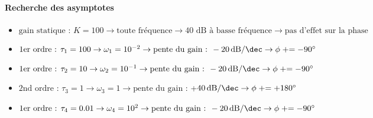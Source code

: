 \paragraph{Recherche des asymptotes}
\begin{itemize}
\item $\textrm{gain statique : } K=100      \rightarrow 
      \textrm{toute fréquence}           \rightarrow 
      \textrm{40 dB à basse fréquence}   \rightarrow 
      \textrm{pas d'effet sur la phase}$
\item $\textrm{1er ordre : }\tau_1=100     \rightarrow 
      \omega_1=10^{-2}                   \rightarrow 
      \textrm{pente du gain : } 
      \SI[per-mode=symbol]{-20}{\dB\per\dec} \rightarrow 
      \phi\mathrel{+}=-90\si{\degree}$ 
\item $ \textrm{1er ordre : }\tau_2=10     \rightarrow 
      \omega_2=10^{-1}                   \rightarrow 
      \textrm{pente du gain : } 
      \SI[per-mode=symbol]{-20}{\dB\per\dec} \rightarrow 
      \phi\mathrel{+}=-90\si{\degree}$ 
\item $ \textrm{2nd ordre : }\tau_3=1   \rightarrow 
      \omega_3=1                         \rightarrow 
      \textrm{pente du gain : } 
      $+$\SI[per-mode=symbol]{40}{\dB\per\dec}  \rightarrow 
      \phi\mathrel{+}=+180\si{\degree}$ 
\item $ \textrm{1er ordre : }\tau_4=0.01     \rightarrow 
      \omega_4=10^{2}                   \rightarrow 
      \textrm{pente du gain : } 
      \SI[per-mode=symbol]{-20}{\dB\per\dec} \rightarrow 
      \phi\mathrel{+}=-90\si{\degree}$ 
\end{itemize}
\begin{center}
    

    
\end{center}
